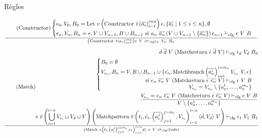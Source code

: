 \documentclass{beamer}
\begin{document}
\begin{frame}{Règles}
\begin{gather}
     \end{gather}
     \begin{gather}
        \tag{Constructor}
        \begin{cases}
           \epsilon_0, V_0, B_0 = \text{Let} ~ v \left( \text{Constructor} ~ t \left( \overline{a_i} \right)_{i=1}^{i=n} \right) \epsilon, \lbrace \overline{a_i} \mid 1 \leq i \leq n \rbrace, \emptyset \\
           \epsilon_n, V_n, B_n = \epsilon, V \cup V_{n-1}, B \cup B_{n-1} \text{ si } a_n ~ \overline{a_n} \left( V \cup V_{n-1} \setminus \lbrace \overline{a_n} \rbrace \right) \epsilon_{n-1} \vdash_{\text{cfg}} \epsilon ~ V ~ B \\
        \end{cases}
        \over \left( \text{Constructor} ~ t \left( a_i \right)_{i=1}^{i=n} \right) v ~ V ~ \epsilon \vdash_{\text{cfg}} \epsilon_n ~ V_n ~ B_n
     \end{gather}
     \begin{gather}
        \tag{Match}
        \begin{split}
           d ~ \overline{d} ~ V ~ (\text{Matchreturn} ~ \dot{\epsilon} ~ \overline{d} ~ V) \vdash_{\text{cfg}} \epsilon_d ~ V_d ~ B_d \\
           \begin{cases}
              B_0 = \emptyset \\
              \begin{split}
              V_{e_n}, B_n = V, B \cup B_{n-1} \cup \lbrace \dot{e_n}, \text{Matchbranch} \left( \overline{a_n^i} \right)_{i=1}^{i=m_n} V_{e_n} ~ V, \epsilon \rbrace \\ \text{ si } e_n ~ \overline{e_n} ~ V ~ (\text{Matchreturn} ~ \dot{\epsilon} ~ \overline{e_n} ~ V) \vdash_{\text{cfg}} \epsilon ~ V ~ B \\
              V_{e_n} = V_{e_n} \setminus \lbrace a_n^1, \dots, a_n^{m_n} \rbrace
              \end{split}
           \end{cases} \\
           { V_{e_n} =
           e_n ~ \overline{e_n} ~ V ~ (\text{Matchreturn} ~ \dot{\epsilon} ~ \overline{e_n} ~ V) \vdash_{\text{cfg}} \epsilon ~ V ~ B
           \over V \setminus \lbrace a_n^1, \dots, a_n^{m_n} \rbrace } \\
           e ~ \overline{e} \left( \bigcup_{i=1}^{i=n} V_{e_i} \cup V_d \cup V \right) \left( \text{Matchpattern} ~ \overline{e} \left( t_i, \dot{e_i}, \left( \overline{a_i^j} \right)_{j=1}^{j=m_i}, V_{e_i} \right)_{i=1}^{i=n} \langle \dot{d}, V_d \rangle ~ V \right) \vdash_{\text{cfg}} \epsilon_1 ~ V_1 ~ B_1
        \end{split}
        \over (\text{Match} ~ e \left( t_i, \left( a_i^j \right)_{j=1}^{j=m_i}, e_i \right)_{i=1}^{i=n} d) ~ v ~ V ~ \epsilon \vdash_{\text{cfg}} (todo)
     \end{gather}
\end{frame}
\end{document}
